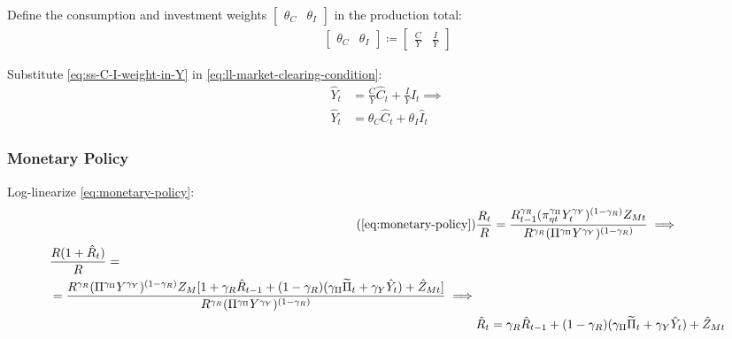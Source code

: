 \documentclass[
	12pt,
	]{article}
\numberwithin{equation}{section}
\theoremstyle{definition}
\theoremstyle{plain}
\theoremstyle{plain}
\theoremstyle{plain}
\begin{document}
Define the consumption and investment weights $\left[ \begin{smallmatrix} \theta_C & \theta_I \end{smallmatrix} \right] $ in the production total:
\begin{align}
	\label{eq:ss-C-I-weight-in-Y}
	\begin{bmatrix}
		\theta_C & \theta_I
	\end{bmatrix} \coloneq 
	\begin{bmatrix}
		\displaystyle \frac{C}{Y} & \displaystyle \frac{I}{Y}
	\end{bmatrix}
\end{align}

Substitute \ref{eq:ss-C-I-weight-in-Y} in \ref{eq:ll-market-clearing-condition}:
\begin{align}
	\hat{Y}_t &= \frac{C}{Y}\hat{C}_t + \frac{I}{Y}\hat{I}_t \implies \nonumber \\
	\hat{Y}_t &= \theta_C \hat{C}_t + \theta_I \hat{I}_t 
	\label{eq:ll-market-clearing-condition-theta}
\end{align}




\subsubsection{Monetary Policy}

Log-linearize \ref{eq:monetary-policy}:
\begin{align}
	\tag{\ref{eq:monetary-policy}}
	& \frac{R_t}{R} = \frac{R_{t-1}^{\gamma_R} (\pi_{\eta t}^{\gamma_\Pi} Y_t^{\gamma_Y})^{(1-\gamma_R)} Z_{Mt}}{R^{\gamma_R} (\Pi^{\gamma_\Pi} Y^{\gamma_Y})^{(1-\gamma_R)}} \implies \\
	\begin{split}
		& \frac{R(1+ \hat{R}_t)}{R} = \\
		&= \frac{ R^{\gamma_R} (\Pi^{\gamma_\Pi} Y^{\gamma_Y})^{(1-\gamma_R)} Z_{M} [1+ \gamma_R \hat{R}_{t-1} + (1-\gamma_R)(\gamma_\Pi \widetilde{\Pi}_t + \gamma_Y \hat{Y}_t) + \hat{Z}_{Mt}]}{R^{\gamma_R} (\Pi^{\gamma_\Pi} Y^{\gamma_Y})^{(1-\gamma_R)}} \implies
	\end{split} \nonumber \\
	& \hat{R}_t = \gamma_R \hat{R}_{t-1} + (1-\gamma_R)(\gamma_\Pi \widetilde{\Pi}_t + \gamma_Y \hat{Y}_t) + \hat{Z}_{Mt} \label{eq:ll-monetary-policy}
\end{align}
\end{document}
